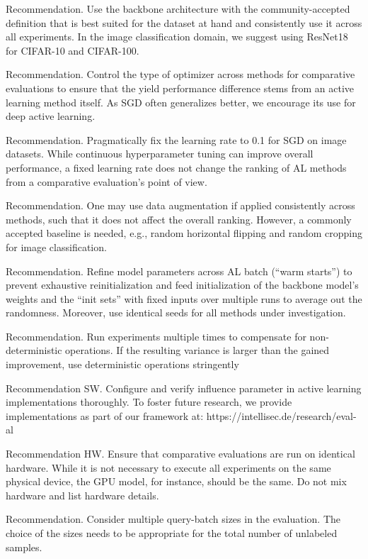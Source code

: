 \documentclass[]{article}
\begin{document}
Recommendation. Use the backbone architecture with
the community-accepted definition that is best suited
for the dataset at hand and consistently use it across all
experiments. In the image classification domain, we
suggest using ResNet18 for CIFAR-10 and CIFAR-100.

Recommendation. Control the type of optimizer across
methods for comparative evaluations to ensure that the
yield performance difference stems from an active learning method itself. As SGD often generalizes better, we
encourage its use for deep active learning.

Recommendation. Pragmatically fix the learning rate
to 0.1 for SGD on image datasets. While continuous
hyperparameter tuning can improve overall performance,
a fixed learning rate does not change the ranking of AL
methods from a comparative evaluation’s point of view.

Recommendation. One may use data augmentation if
applied consistently across methods, such that it does
not affect the overall ranking. However, a commonly
accepted baseline is needed, e.g., random horizontal flipping and random cropping for image classification.

Recommendation. Refine model parameters across AL
batch (“warm starts”) to prevent exhaustive reinitialization and feed initialization of the backbone model’s
weights and the “init sets” with fixed inputs over multiple runs to average out the randomness. Moreover, use
identical seeds for all methods under investigation.

Recommendation. Run experiments multiple times to
compensate for non-deterministic operations. If the resulting variance is larger than the gained improvement,
use deterministic operations stringently

Recommendation SW. Configure and verify influence parameter in active learning implementations thoroughly. To foster future research, we
provide implementations as part of our framework at:
https://intellisec.de/research/eval-al

Recommendation HW. Ensure that comparative evaluations are run on identical hardware. While it is not
necessary to execute all experiments on the same physical device, the GPU model, for instance, should be the
same. Do not mix hardware and list hardware details.

Recommendation. Consider multiple query-batch sizes
in the evaluation. The choice of the sizes needs to be
appropriate for the total number of unlabeled samples.
\end{document}
